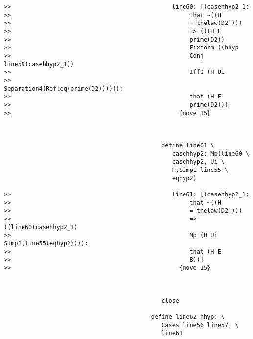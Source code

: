 \documentclass[12pt]{article}
\begin{document}
\begin{verbatim}
>>                                              line60: [(casehhyp2_1:
>>                                                   that ~((H
>>                                                   = thelaw(D2))))
>>                                                   => (((H E
>>                                                   prime(D2))
>>                                                   Fixform ((hhyp
>>                                                   Conj line59(casehhyp2_1))
>>                                                   Iff2 (H Ui
>>                                                   Separation4(Refleq(prime(D2)))))):
>>                                                   that (H E
>>                                                   prime(D2)))]
>>                                                {move 15}



                                             define line61 \
                                                casehhyp2: Mp(line60 \
                                                casehhyp2, Ui \
                                                H,Simp1 line55 \
                                                eqhyp2)

>>                                              line61: [(casehhyp2_1:
>>                                                   that ~((H
>>                                                   = thelaw(D2))))
>>                                                   => ((line60(casehhyp2_1)
>>                                                   Mp (H Ui Simp1(line55(eqhyp2)))):
>>                                                   that (H E
>>                                                   B))]
>>                                                {move 15}



                                             close

                                          define line62 hhyp: \
                                             Cases line56 line57, \
                                             line61


\end{verbatim}
\end{document}
